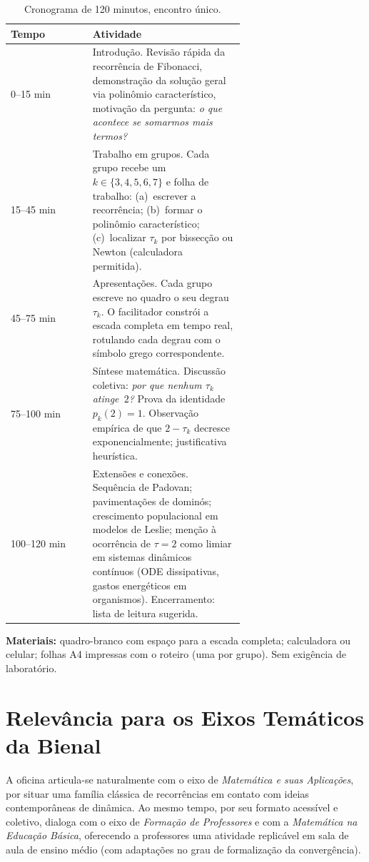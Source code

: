 \documentclass[11pt,a4paper]{article}
\begin{document}
\begin{table}[h]
\centering
\small
\begin{tabular}{@{}lp{0.65\linewidth}@{}}
\toprule
\textbf{Tempo} & \textbf{Atividade} \\
\midrule
0--15 min   & Introdução. Revisão rápida da recorrência de Fibonacci, demonstração da solução geral via polinômio característico, motivação da pergunta: \emph{o que acontece se somarmos mais termos?} \\
15--45 min  & Trabalho em grupos. Cada grupo recebe um $k \in \{3, 4, 5, 6, 7\}$ e folha de trabalho: (a)~escrever a recorrência; (b)~formar o polinômio característico; (c)~localizar $\tau_k$ por bissecção ou Newton (calculadora permitida). \\
45--75 min  & Apresentações. Cada grupo escreve no quadro o seu degrau $\tau_k$. O facilitador constrói a escada completa em tempo real, rotulando cada degrau com o símbolo grego correspondente. \\
75--100 min & Síntese matemática. Discussão coletiva: \emph{por que nenhum $\tau_k$ atinge~$2$?} Prova da identidade $p_k(2) = 1$. Observação empírica de que $2 - \tau_k$ decresce exponencialmente; justificativa heurística. \\
100--120 min & Extensões e conexões. Sequência de Padovan; pavimentações de domi\-nós; crescimento populacional em modelos de Leslie; menção à ocorrência de $\tau = 2$ como limiar em sistemas dinâmicos contínuos (ODE dissipativas, gastos energéticos em organismos). Encerramento: lista de leitura sugerida. \\
\bottomrule
\end{tabular}
\caption{Cronograma de 120 minutos, encontro único.}
\end{table}

\noindent\textbf{Materiais:} quadro-branco com espaço para a escada completa; calculadora ou celular; folhas A4 impressas com o roteiro (uma por grupo). Sem exigência de laboratório.

\section*{Relevância para os Eixos Temáticos da Bienal}

A oficina articula-se naturalmente com o eixo de \emph{Matemática e suas Aplicações}, por situar uma família clássica de recorrências em contato com ideias contemporâneas de dinâmica. Ao mesmo tempo, por seu formato acessível e coletivo, dialoga com o eixo de \emph{Formação de Professores} e com a \emph{Matemática na Educação Básica}, oferecendo a professores uma atividade replicável em sala de aula de ensino médio (com adaptações no grau de formalização da convergência).
\end{document}
